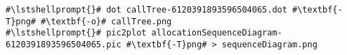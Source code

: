 \begin{lstlisting}[caption=Commands to convert the diagrams,label=lst:traceAnalysis:convertDiagrams]
#\lstshellprompt{}# dot callTree-6120391893596504065.dot #\textbf{-T}png# #\textbf{-o}# callTree.png
#\lstshellprompt{}# pic2plot allocationSequenceDiagram-6120391893596504065.pic #\textbf{-T}png# > sequenceDiagram.png			 
\end{lstlisting}